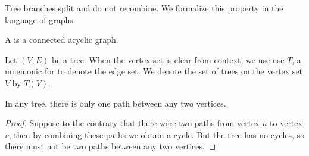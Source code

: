 

Tree branches split
and do not recombine.
We formalize this
property in the
language of graphs.


A
is a
connected
acyclic graph.


Let $(V, E)$ be a tree.
When the vertex set is clear
from context, we use
use $T$, a mnemonic for 
to denote the edge set.
We denote the set of trees
on the vertex set $V$ by
$T(V)$.


\begin{prop}
  In any tree,
  there is only one
  path between
  any two vertices.

\begin{proof}
  Suppose to the contrary that
  there were two paths from
  vertex $u$ to vertex $v$,
  then by combining these paths
  we obtain a cycle. But the
  tree has no cycles,
  so there must not be two paths
  between any two vertices.
\end{proof}
\end{prop}
